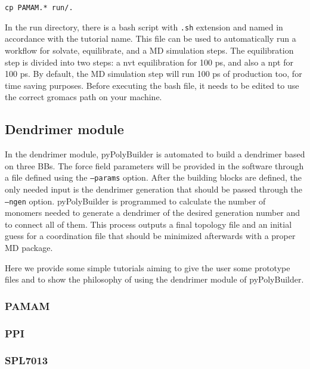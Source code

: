 \documentclass[12pt]{article}
\begin{document}
\begin{lstlisting}
cp PAMAM.* run/.
\end{lstlisting}

In the run directory, there is a bash script with \texttt{.sh} extension and named in accordance with the tutorial name.
This file can be used to automatically run a workflow for solvate, equilibrate, and a MD simulation steps.
The equilibration step is divided into two steps: a nvt equilibration for 100 ps, and also a npt for 100 ps.
By default, the MD simulation step will run 100 ps of production too, for time saving purposes.
Before executing the bash file, it needs to be edited to use the correct gromacs path on your machine.

\subsection{Dendrimer module}
In the dendrimer module, pyPolyBuilder is automated to build a dendrimer based on three BBs.
The force field parameters will be provided in the software through a file defined using the \texttt{--params} option.
After the building blocks are defined, the only needed input is the dendrimer generation that should be passed through the \texttt{--ngen} option.
pyPolyBuilder is programmed to calculate the number of monomers needed to generate a dendrimer of the desired generation number and to connect all of them.
This process outputs a final topology file and an initial guess for a coordination file that should be minimized afterwards with a proper MD package.

Here we provide some simple tutorials aiming to give the user some prototype files and to show the philosophy of using the dendrimer module of pyPolyBuilder.

\subsubsection{PAMAM}

\clearpage

\subsubsection{PPI}

\clearpage

\subsubsection{SPL7013}

\clearpage
\end{document}
